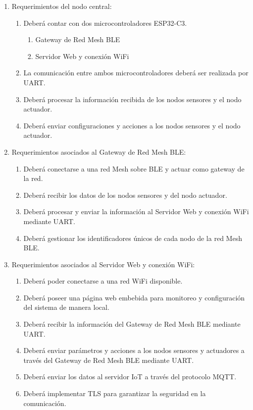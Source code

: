 \documentclass[
11pt, %
codirector, %
]{charter}
\begin{document}
\begin{enumerate}
	\item Requerimientos del nodo central:
	      \begin{enumerate}
		      \item Deberá contar con dos microcontroladores ESP32-C3.
		            \begin{enumerate}
			            \item Gateway de Red Mesh BLE
			            \item Servidor Web y conexión WiFi
		            \end{enumerate}
		      \item La comunicación entre ambos microcontroladores deberá ser realizada por UART.
		      \item Deberá procesar la información recibida de los nodos sensores y el nodo actuador.
		      \item Deberá enviar configuraciones y acciones a los nodos sensores y el nodo actuador.
	      \end{enumerate}

	      \pagebreak

	\item Requerimientos asociados al Gateway de Red Mesh BLE:
	      \begin{enumerate}
		      \item Deberá conectarse a una red Mesh sobre BLE y actuar como gateway de la red.
		      \item Deberá recibir los datos de los nodos sensores y del nodo actuador.
		      \item Deberá procesar y enviar la información al Servidor Web y conexión WiFi mediante UART.
		      \item Deberá gestionar los identificadores únicos de cada nodo de la red Mesh BLE.
	      \end{enumerate}

	\item Requerimientos asociados al Servidor Web y conexión WiFi:
	      \begin{enumerate}
		      \item Deberá poder conectarse a una red WiFi disponible.
		      \item Deberá poseer una página web embebida para monitoreo y configuración del sistema de manera local.
		      \item Deberá recibir la información del Gateway de Red Mesh BLE mediante UART.
		      \item Deberá enviar parámetros y acciones a los nodos sensores y actuadores a través del Gateway de Red Mesh BLE mediante UART.
		      \item Deberá enviar los datos al servidor IoT a través del protocolo MQTT.
		      \item Deberá implementar TLS para garantizar la seguridad en la comunicación.
	      \end{enumerate}


\end{enumerate}
\end{document}
